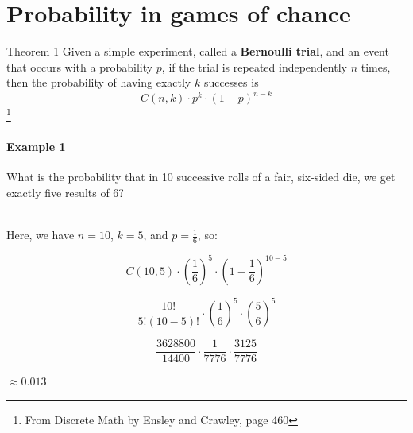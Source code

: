 \documentclass[a4paper,12pt]{book}
\title{}
\author{Rachel Morris}
\date{\today}
\begin{document}
   	\toggletrue{answerkey}

    \section{Probability in games of chance}

        \begin{intro}{Theorem 1}
            Given a simple experiment, called a \textbf{Bernoulli trial},
            and an event that occurs with a probability $p$, if the trial is repeated
            independently $n$ times, then the probability of having exactly
            $k$ successes is
            $$ C(n, k) \cdot p^{k} \cdot (1 - p)^{n-k} $$
            \footnote{From Discrete Math by Ensley and Crawley, page 460}

            \paragraph{Example 1}
            What is the probability that in 10 successive rolls of a fair, six-sided
            die, we get exactly five results of 6?

            ~\\
            Here, we have $n = 10$, $k = 5$, and $p = \frac{1}{6}$, so:

            $$C(10, 5) \cdot (\frac{1}{6})^{5} \cdot (1 - \frac{1}{6})^{10-5}$$

            $$\frac{10!}{5!(10-5)!} \cdot (\frac{1}{6})^{5} \cdot (\frac{5}{6})^{5} $$

            $$\frac{3628800}{14400} \cdot \frac{1}{7776} \cdot \frac{3125}{7776} $$

            \begin{center}
                $ \approx 0.013 $
            \end{center}

        \end{intro}
        
\end{document}
